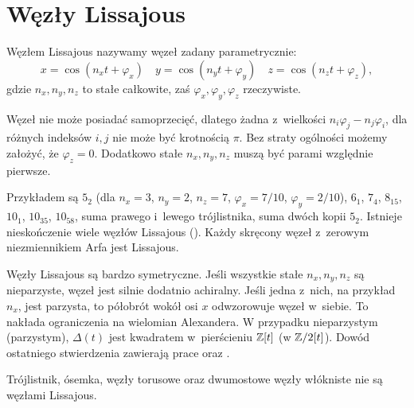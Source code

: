 \section{Węzły Lissajous} %
\label{sec:lissajous}

\begin{definition}
	Węzłem Lissajous nazywamy węzeł zadany parametrycznie:
	\[
		x = \cos(n_xt + \varphi_x) \quad
		y = \cos(n_yt + \varphi_y) \quad
		z = \cos(n_zt + \varphi_z),
	\]
	gdzie $n_x, n_y, n_z$ to stałe całkowite, zaś $\varphi_x, \varphi_y, \varphi_z$ rzeczywiste.
\end{definition}

Węzeł nie może posiadać samoprzecięć, dlatego żadna z~wielkości $n_i\varphi_j-n_j\varphi_i$, dla różnych indeksów $i, j$ nie może być krotnością $\pi$.
Bez straty ogólności możemy założyć, że $\varphi_z = 0$.
Dodatkowo stałe $n_x, n_y, n_z$ muszą być parami względnie pierwsze.

Przykładem są $5_2$ (dla $n_x = 3$, $n_y = 2$, $n_z = 7$, $\varphi_x = 7/10$, $\varphi_y = 2/10$), $6_1$, $7_4$, $8_{15}$, $10_1$, $10_{35}$, $10_{58}$, suma prawego i~lewego trójlistnika, suma dwóch kopii $5_2$.
Istnieje nieskończenie wiele węzłów Lissajous (\cite{lamm97}).
Każdy skręcony węzeł z~zerowym niezmiennikiem Arfa jest Lissajous.

Węzły Lissajous są bardzo symetryczne.
Jeśli wszystkie stałe $n_x, n_y, n_z$ są nieparzyste, węzeł jest silnie dodatnio achiralny.
Jeśli jedna z~nich, na przykład $n_x$, jest parzysta, to półobrót wokół osi $x$ odwzorowuje węzeł w~siebie.
To nakłada ograniczenia na wielomian Alexandera.
W przypadku nieparzystym (parzystym), $\Delta(t)$ jest kwadratem w~pierścieniu $\mathbb Z[t]$ (w $\mathbb Z/2[t]$).
Dowód ostatniego stwierdzenia zawierają prace \cite{hartley79} oraz \cite{murasugi71}.

\begin{corollary}
	Trójlistnik, ósemka, węzły torusowe oraz dwumostowe węzły włókniste nie są węzłami Lissajous.
\end{corollary}

